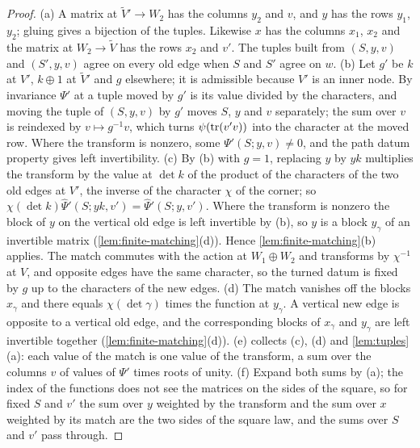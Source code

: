 \begin{proof}
(a) A matrix at $\tilde V'\to W_2$ has the columns $y_2$ and $v$, and $y$ has the rows $y_1$, $y_2$; gluing gives a bijection of the tuples. Likewise $x$ has the columns $x_1$, $x_2$ and the matrix at $W_2\to\tilde V$ has the rows $x_2$ and $v'$.
The tuples built from $(S,y,v)$ and $(S',y,v)$ agree on every old edge when $S$ and $S'$ agree on $w$. (b) Let $g'$ be $k$ at $V'$, $k\oplus1$ at $\tilde V'$ and $g$ elsewhere; it is admissible because $V'$ is an inner node. By invariance $\Psi'$ at a
tuple moved by $g'$ is its value divided by the characters, and moving the tuple of $(S,y,v)$ by $g'$ moves $S$, $y$ and $v$ separately; the sum over $v$ is reindexed by $v\mapsto g^{-1}v$, which turns $\psi(\operatorname{tr}(v'v))$ into the
character at the moved row. Where the transform is nonzero, some $\Psi'(S;y,v)\ne0$, and the path datum property gives left invertibility. (c) By (b) with $g=1$, replacing $y$ by $yk$ multiplies the transform by the value at $\det k$ of the product of the characters of the two old edges at $V'$, the inverse of the character $\chi$ of the
corner; so $\chi(\det k)\hat\Psi'(S;yk,v')=\hat\Psi'(S;y,v')$. Where the transform is nonzero the block of $y$ on the vertical old edge is left invertible by (b), so $y$ is a block $y_\gamma$ of an invertible
matrix (\cref{lem:finite-matching}(d)). Hence \cref{lem:finite-matching}(b) applies. The match commutes with the action at $W_1\oplus W_2$ and transforms by $\chi^{-1}$ at $V$, and opposite edges have the same
character, so the turned datum is fixed by $g$ up to the characters of the new edges. (d) The match vanishes off the blocks $x_\gamma$ and there equals $\chi(\det\gamma)$ times the function at $y_\gamma$. A vertical new edge is opposite
to a vertical old edge, and the corresponding blocks of $x_\gamma$ and $y_\gamma$ are left invertible together (\cref{lem:finite-matching}(d)). (e) collects (c), (d) and \cref{lem:tuples}(a): each value of the match is one value of
the transform, a sum over the columns $v$ of values of $\Psi'$ times roots of unity. (f) Expand both sums by (a); the index of the functions does not see the matrices on the sides of the square, so for fixed $S$ and $v'$ the sum
over $y$ weighted by the transform and the sum over $x$ weighted by its match are the two sides of the square law, and the sums over $S$ and $v'$ pass through.
\end{proof}

